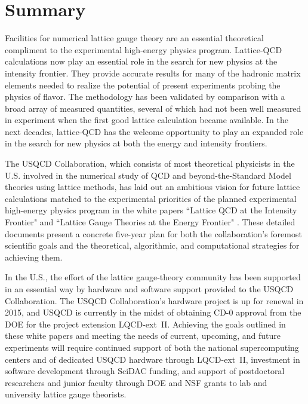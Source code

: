 \section{Summary}
\label{sec:lqcd:summ}

Facilities for numerical lattice gauge theory are an essential theoretical compliment to the experimental
high-energy physics program.  Lattice-QCD calculations now play an essential role in the search for new physics at the intensity frontier.
They provide accurate results for many of the hadronic matrix elements needed to realize the potential of
present experiments probing the physics of flavor. The methodology has been validated by comparison 
with a broad array of measured quantities, several of which had not been well measured in experiment when the first good lattice calculation became available.  In the next decades, lattice-QCD has the welcome opportunity to play an expanded role in the search for new physics at both the energy and intensity frontiers.  

The USQCD Collaboration, which consists of most theoretical physicists in the U.S. involved in the numerical study of QCD and beyond-the-Standard Model theories using lattice methods, has laid out an ambitious vision for future lattice calculations matched to the experimental priorities of the planned experimental high-energy physics program in the white papers ``Lattice QCD at the Intensity Frontier" and ``Lattice Gauge Theories at the Energy Frontier" \cite{USQCD_IF_whitepaper13,USQCD_EF_whitepaper13}.  These detailed documents present a concrete five-year plan for both the collaboration's foremost scientific goals and the theoretical, algorithmic, and computational strategies for achieving them.

In the U.S., the effort of the lattice gauge-theory community has been supported in an essential way by hardware and software support provided to the USQCD Collaboration.  The USQCD Collaboration's hardware project is up for renewal in 2015, and USQCD is currently in the midst of obtaining CD-0 approval from the DOE for the project extension LQCD-ext~II.  Achieving the goals outlined in these white papers and meeting the needs of current, upcoming, and future experiments will require continued support of both the national supercomputing centers and of dedicated USQCD hardware through LQCD-ext~II, investment in software development through SciDAC funding, and support of postdoctoral researchers and junior faculty through DOE and NSF grants to lab and university lattice gauge theorists.   

